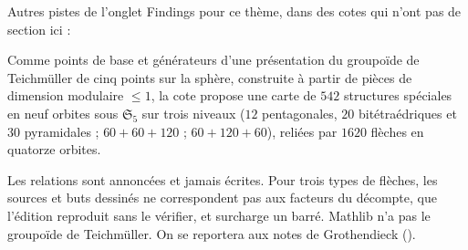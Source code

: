 \bigskip
\noindent Autres pistes de l'onglet Findings pour ce thème, dans des cotes qui n'ont pas de section ici :\par

\begin{encadre}
\begin{exemple*}\nonverifie
Comme points de base et générateurs d'une présentation du groupoïde de Teichmüller de cinq points sur la sphère, construite à partir de pièces de dimension modulaire $\leq 1$, la cote propose une carte de $542$ structures spéciales en neuf orbites sous $\mathfrak S_5$ sur trois niveaux ($12$ pentagonales, $20$ bitétraédriques et $30$ pyramidales ; $60 + 60 + 120$ ; $60 + 120 + 60$), reliées par $1620$ flèches en quatorze orbites.
\end{exemple*}
\end{encadre}
{\small Les relations sont annoncées et jamais écrites. Pour trois types de flèches, les sources et buts dessinés ne correspondent pas aux facteurs du décompte, que l'édition reproduit sans le vérifier, et  surcharge un  barré. Mathlib n'a pas le groupoïde de Teichmüller. On se reportera aux notes de Grothendieck ().\par}

